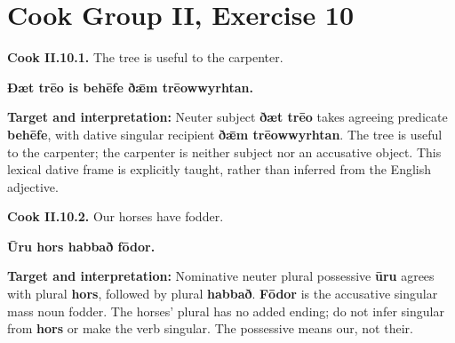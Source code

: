 \section*{Cook Group II, Exercise 10}

\par\begin{minipage}{\linewidth}\raggedright
\textbf{Cook II.10.1.} The tree is useful to the carpenter.

\textbf{Ðæt trēo is behēfe ðǣm trēowwyrhtan.}

\textbf{Target and interpretation:} Neuter subject \textbf{ðæt trēo} takes agreeing predicate \textbf{behēfe}, with dative singular recipient \textbf{ðǣm trēowwyrhtan}. The tree is useful to the carpenter; the carpenter is neither subject nor an accusative object. This lexical dative frame is explicitly taught, rather than inferred from the English adjective.

\end{minipage}\par\addvspace{4pt}

\par\begin{minipage}{\linewidth}\raggedright
\textbf{Cook II.10.2.} Our horses have fodder.

\textbf{Ūru hors habbað fōdor.}

\textbf{Target and interpretation:} Nominative neuter plural possessive \textbf{ūru} agrees with plural \textbf{hors}, followed by plural \textbf{habbað}. \textbf{Fōdor} is the accusative singular mass noun fodder. The horses' plural has no added ending; do not infer singular from \textbf{hors} or make the verb singular. The possessive means our, not their.

\end{minipage}\par\addvspace{4pt}

